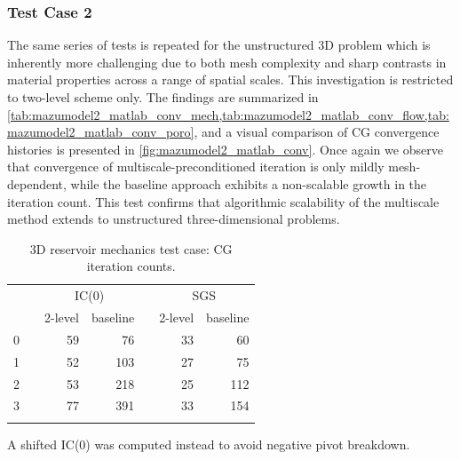 \subsubsection{Test Case 2}

The same series of tests is repeated for the unstructured 3D problem which is inherently more challenging due to both mesh complexity and sharp contrasts in material properties across a range of spatial scales.    This investigation is restricted to two-level scheme only.   The findings are summarized in \cref{tab:mazumodel2_matlab_conv_mech,tab:mazumodel2_matlab_conv_flow,tab:mazumodel2_matlab_conv_poro}, and a visual comparison of CG convergence histories is presented in \cref{fig:mazumodel2_matlab_conv}.   Once again we observe that convergence of multiscale-preconditioned iteration is only mildly mesh-dependent, while the baseline approach exhibits a non-scalable growth in the iteration count.   This test confirms that algorithmic scalability of the multiscale method extends to unstructured three-dimensional problems.

\begin{table}
    \centering
    \caption{3D reservoir mechanics test case: CG iteration counts.}
    \label{tab:mazumodel2_matlab_conv_mech}
    \let\TPToverlap=\TPTrlap
    \begin{threeparttable}[t]
    \begin{tabular}{rrrrrrr}
        \hline\noalign{\smallskip}
        \multirow{2}{*}{$\ell$} & & \multicolumn{2}{c}{IC(0)} & & \multicolumn{2}{c}{SGS} \\
        \noalign{\smallskip}\cline{3-4} \cline{6-7}\noalign{\smallskip}
        & & 2-level & baseline & & 2-level & baseline \\
        \hline\noalign{\smallskip}
        0 & & 59 &  76 & & 33 &  60 \\
        1 & & 52 & 103 & & 27 &  75 \\
        2 & & 53 & 218 & & 25 & 112 \\
        3 & & 77\tnote{\textsuperscript{\textdagger}} & 391\tnote{\textsuperscript{\textdagger}} & & 33 & 154 \\
        \hline\noalign{\smallskip}
    \end{tabular}
    \begin{tablenotes}
        \item [\textsuperscript{\textdagger}] A shifted IC(0) was computed instead to avoid negative pivot breakdown.
    \end{tablenotes}
    \end{threeparttable}
\end{table}


